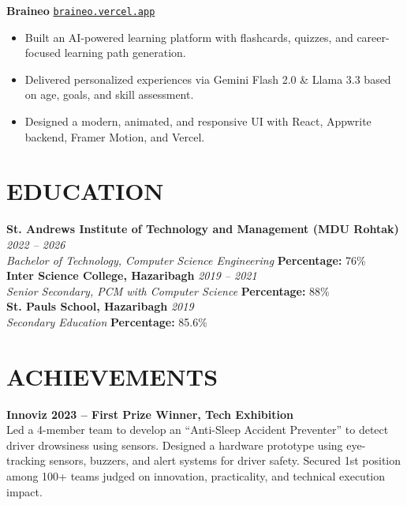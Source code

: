 \documentclass[a4paper,11pt]{article}
\begin{document}
\textbf{Braineo} \hfill \href{https://braineo.vercel.app}{\texttt{braineo.vercel.app}}
\begin{itemize}
    \item Built an AI-powered learning platform with flashcards, quizzes, and career-focused learning path generation.
    \item Delivered personalized experiences via Gemini Flash 2.0 \& Llama 3.3 based on age, goals, and skill assessment.
    \item Designed a modern, animated, and responsive UI with React, Appwrite backend, Framer Motion, and Vercel.
\end{itemize}

\section*{EDUCATION}
\textbf{St. Andrews Institute of Technology and Management (MDU Rohtak)} \hfill \textit{2022 -- 2026} \\
\textit{Bachelor of Technology, Computer Science Engineering} \hfill \textbf{Percentage:} 76\% \\
\textbf{Inter Science College, Hazaribagh} \hfill \textit{2019 -- 2021} \\
\textit{Senior Secondary, PCM with Computer Science} \hfill \textbf{Percentage:} 88\% \\
\textbf{St. Pauls School, Hazaribagh} \hfill \textit{2019} \\
\textit{Secondary Education} \hfill \textbf{Percentage:} 85.6\%

\section*{ACHIEVEMENTS}
\textbf{Innoviz 2023 -- First Prize Winner, Tech Exhibition} \\
Led a 4-member team to develop an ``Anti-Sleep Accident Preventer'' to detect driver drowsiness using sensors. Designed a hardware prototype using eye-tracking sensors, buzzers, and alert systems for driver safety. Secured 1st position among 100+ teams judged on innovation, practicality, and technical execution impact.
\end{document}

